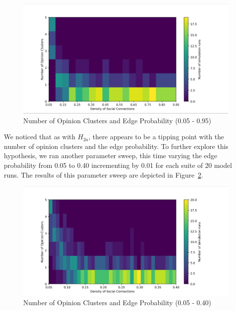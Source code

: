 \begin{figure}
\centering
\includegraphics[width=1.0\columnwidth]{./Graphs/ClusterEdge/Cluster_edgeBig.png}
\caption{Number of Opinion Clusters and Edge Probability (0.05 - 0.95)}
\label{H2a_plot_big}
\end{figure}

We noticed that as with $H_{2a}$, there appears to be a tipping point with the
number of opinion clusters and the edge probability. To further explore this
hypothesis, we ran another parameter sweep, this time varying the edge
probability from 0.05 to 0.40 incrementing by 0.01 for each suite of 20 model
runs. The results of this parameter sweep are depicted in
Figure~\ref{H2a_plot_small}.

\begin{figure}
\centering
\includegraphics[width=1.0\columnwidth]{./Graphs/ClusterEdge/Cluster_edgesmall.png}
\caption{Number of Opinion Clusters and Edge Probability (0.05 - 0.40)}
\label{H2a_plot_small}
\end{figure}

